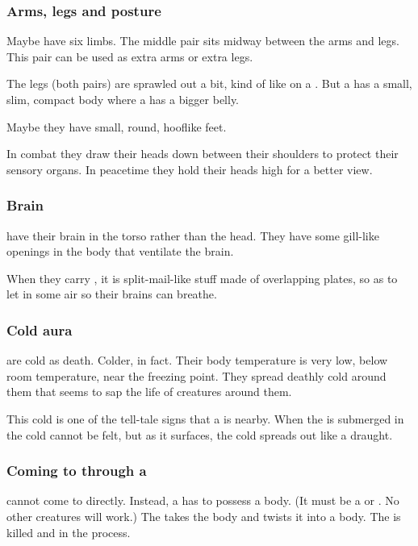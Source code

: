 \subsubsection{Arms, legs and posture}
Maybe \banes{} have six limbs. 
The middle pair sits midway between the arms and legs. 
This pair can be used as extra arms or extra legs. 

The legs (both pairs) are sprawled out a bit, kind of like on a \meccaran. 
But a \bane{} has a small, slim, compact body where a \meccaran{} has a bigger belly. 

Maybe they have small, round, hooflike feet. 

In combat they draw their heads down between their shoulders to protect their sensory organs. 
In peacetime they hold their heads high for a better view.





\subsubsection{Brain}
\Banes{} have their brain in the torso rather than the head. 
They have some gill-like openings in the body that ventilate the brain. 

When they carry \armour, it is split-mail-like stuff made of overlapping plates, so as to let in some air so their brains can breathe. 





\subsubsection{Cold aura}
\Banes{} are cold as death. Colder, in fact. Their body temperature is very low, below room temperature, near the freezing point. They spread deathly cold around them that seems to sap the life of creatures around them. 

This cold is one of the tell-tale signs that a \bane{} is nearby. When the \bane{} is submerged in \Nyx{} the cold cannot be felt, but as it surfaces, the cold spreads out like a draught. 





\subsubsection{Coming to \Miith{} through a \human}
\Banes{} cannot come to \Miith{} directly. 
Instead, a \bane{} has to possess a \human{} body. 
(It must be a \human{} or \resphan. No other creatures will work.) 
The \bane{} takes the body and twists it into a \bane{} body. 
The \human{} is killed and  in the process. 

